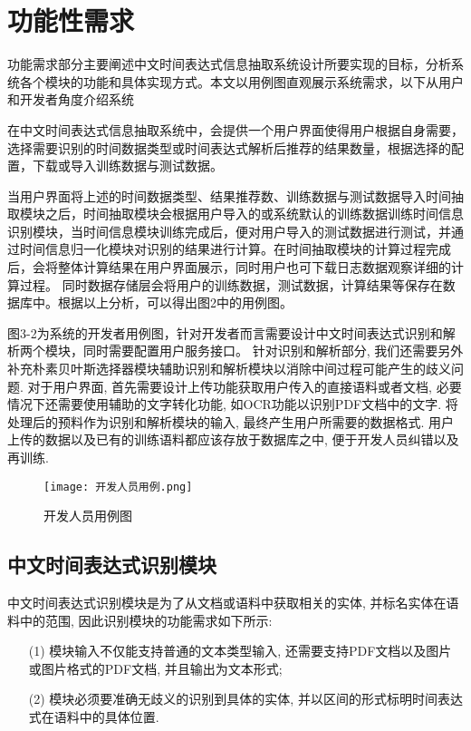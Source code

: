 \section{功能性需求}



功能需求部分主要阐述中文时间表达式信息抽取系统设计所要实现的目标，分析系统各个模块的功能和具体实现方式。本文以用例图直观展示系统需求，以下从用户和开发者角度介绍系统

在中文时间表达式信息抽取系统中，会提供一个用户界面使得用户根据自身需要，选择需要识别的时间数据类型或时间表达式解析后推荐的结果数量，根据选择的配置，下载或导入训练数据与测试数据。

当用户界面将上述的时间数据类型、结果推荐数、训练数据与测试数据导入时间抽取模块之后，时间抽取模块会根据用户导入的或系统默认的训练数据训练时间信息识别模块，当时间信息模块训练完成后，便对用户导入的测试数据进行测试，并通过时间信息归一化模块对识别的结果进行计算。在时间抽取模块的计算过程完成后，会将整体计算结果在用户界面展示，同时用户也可下载日志数据观察详细的计算过程。
同时数据存储层会将用户的训练数据，测试数据，计算结果等保存在数据库中。根据以上分析，可以得出图2中的用例图。

图3-2为系统的开发者用例图，针对开发者而言需要设计中文时间表达式识别和解析两个模块，同时需要配置用户服务接口。
针对识别和解析部分, 我们还需要另外补充朴素贝叶斯选择器模块辅助识别和解析模块以消除中间过程可能产生的歧义问题.
对于用户界面, 首先需要设计上传功能获取用户传入的直接语料或者文档, 必要情况下还需要使用辅助的文字转化功能, 如OCR功能以识别PDF文档中的文字.
将处理后的预料作为识别和解析模块的输入, 最终产生用户所需要的数据格式.
用户上传的数据以及已有的训练语料都应该存放于数据库之中, 便于开发人员纠错以及再训练.

\begin{figure}[h]
    \centering
    \texttt{[image: 开发人员用例.png]}
    \caption{开发人员用例图}
    \label{fig:badge}
\end{figure}

\subsection{中文时间表达式识别模块}

中文时间表达式识别模块是为了从文档或语料中获取相关的实体, 并标名实体在语料中的范围, 因此识别模块的功能需求如下所示:
\begin{enumerate}
    \item[(1)] 模块输入不仅能支持普通的文本类型输入, 还需要支持PDF文档以及图片或图片格式的PDF文档, 并且输出为文本形式;
    \item[(2)] 模块必须要准确无歧义的识别到具体的实体, 并以区间的形式标明时间表达式在语料中的具体位置.
\end{enumerate}


